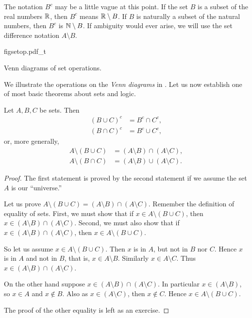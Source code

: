 The notation $B^c$ may be a little vague at this point.  If
the set $B$ is a subset of the real numbers ${\mathbb{R}}$, then $B^c$ means
${\mathbb{R}} \setminus B$.  If $B$ is naturally a subset of the natural numbers,
then $B^c$
is ${\mathbb{N}} \setminus B$.  If ambiguity would ever arise, we will 
use the set difference notation $A \setminus B$.

\begin{myfigureht}
{figsetop.pdf_t}
\caption{Venn diagrams of set operations.\label{figsetop}}
\end{myfigureht}
We illustrate the operations on the
\emph{Venn diagrams} in .
Let us now establish one of most basic theorems about sets and logic.

\begin{thm}[DeMorgan]
Let $A, B, C$ be sets.  Then
\begin{align*}
{(B \cup C)}^c &= B^c \cap C^c , \\
{(B \cap C)}^c &= B^c \cup C^c ,
\end{align*}
or, more generally,
\begin{align*}
A \setminus (B \cup C) &= (A \setminus B) \cap (A \setminus C) , \\
A \setminus (B \cap C) &= (A \setminus B) \cup (A \setminus C) .
\end{align*}
\end{thm}

\begin{proof}
The first statement is proved by the second statement if we
assume the set $A$ is our ``universe.''

Let us prove $A \setminus (B \cup C) = (A \setminus B) \cap (A \setminus C)$.
Remember the definition of equality of sets.  First, we must show that
if $x \in A \setminus (B \cup C)$, then
$x \in (A \setminus B) \cap (A \setminus C)$.  Second, we must also show that
if $x \in (A \setminus B) \cap (A \setminus C)$, then
$x \in A \setminus (B \cup C)$.

So let us assume $x \in A \setminus (B \cup C)$.  Then $x$ is in 
$A$, but not in $B$ nor $C$.  Hence $x$ is in $A$ and not in $B$, that is,
$x \in A \setminus B$.  Similarly $x \in A \setminus C$.  Thus
$x \in (A \setminus B) \cap (A \setminus C)$.

On the other hand suppose 
$x \in (A \setminus B) \cap (A \setminus C)$.  In particular
$x \in (A \setminus B)$, so 
$x \in A$ and $x \notin B$.  Also as $x \in (A \setminus C)$, then $x \notin C$.
Hence $x \in A \setminus (B \cup C)$.

The proof of the other equality is left as an exercise.
\end{proof}


